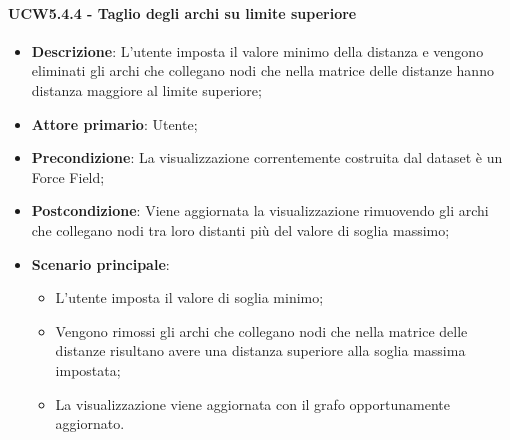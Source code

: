 \paragraph{UCW5.4.4 - Taglio degli archi su limite superiore}
\label{par:ucw5.4.4}
\begin{itemize}
    \item \textbf{Descrizione}:     L'utente imposta il valore minimo della distanza e vengono eliminati gli archi che collegano nodi che nella matrice delle distanze hanno distanza maggiore al limite superiore;
    \item \textbf{Attore primario}: Utente;
    \item \textbf{Precondizione}:   La visualizzazione correntemente costruita dal dataset è un Force Field;
    \item \textbf{Postcondizione}:  Viene aggiornata la visualizzazione rimuovendo gli archi  che collegano nodi tra loro distanti più del valore di soglia massimo;
    \item \textbf{Scenario principale}:
    \begin{itemize}
        \item L'utente imposta il valore di soglia minimo;
        \item Vengono rimossi gli archi che collegano nodi che nella matrice delle distanze risultano avere una distanza superiore alla soglia massima impostata;
        \item La visualizzazione viene aggiornata con il grafo opportunamente aggiornato.
    \end{itemize}
\end{itemize}

